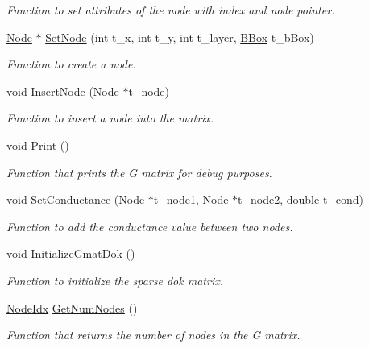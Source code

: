\begin{DoxyCompactItemize}
\begin{DoxyCompactList}\small\item\em Function to set attributes of the node with index and node pointer. \end{DoxyCompactList}\item 
\hyperlink{classNode}{Node} $\ast$ \hyperlink{classGMat_a6edc525006b72ebcd8b9cfbbec60e9ae}{Set\+Node} (int t\+\_\+x, int t\+\_\+y, int t\+\_\+layer, \hyperlink{node_8h_acf0ff4a0bb7e0c9b5900382cbd2aa614}{B\+Box} t\+\_\+b\+Box)
\begin{DoxyCompactList}\small\item\em Function to create a node. \end{DoxyCompactList}\item 
void \hyperlink{classGMat_aab1c09d83c7ad0b0b16d1c8059f1220b}{Insert\+Node} (\hyperlink{classNode}{Node} $\ast$t\+\_\+node)
\begin{DoxyCompactList}\small\item\em Function to insert a node into the matrix. \end{DoxyCompactList}\item 
void \hyperlink{classGMat_a890e83e8d1d373e3858bd213b76c2da9}{Print} ()
\begin{DoxyCompactList}\small\item\em Function that prints the G matrix for debug purposes. \end{DoxyCompactList}\item 
void \hyperlink{classGMat_a1981ec0047b10ef19b2e4734921a5452}{Set\+Conductance} (\hyperlink{classNode}{Node} $\ast$t\+\_\+node1, \hyperlink{classNode}{Node} $\ast$t\+\_\+node2, double t\+\_\+cond)
\begin{DoxyCompactList}\small\item\em Function to add the conductance value between two nodes. \end{DoxyCompactList}\item 
void \hyperlink{classGMat_ab3e602af5a1537611ec1a8bfd798b688}{Initialize\+Gmat\+Dok} ()
\begin{DoxyCompactList}\small\item\em Function to initialize the sparse dok matrix. \end{DoxyCompactList}\item 
\hyperlink{node_8h_a5b622fe4354316a2f349615d150ae998}{Node\+Idx} \hyperlink{classGMat_aa0f8d64bc65172c457d7d1d4a2156b79}{Get\+Num\+Nodes} ()
\begin{DoxyCompactList}\small\item\em Function that returns the number of nodes in the G matrix. \end{DoxyCompactList}\item 

\end{DoxyCompactItemize}
